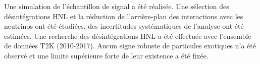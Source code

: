 \documentclass[./main.tex]{subfiles}
\begin{document}
Une simulation de l'échantillon de signal a été réalisée. Une sélection des désintégrations HNL et la réduction de l'arrière-plan des interactions avec les neutrinos ont été étudiées, des incertitudes systématiques de l'analyse ont été estimées. Une recherche des désintégrations HNL a été effectuée avec l'ensemble de données T2K (2010-2017). Aucun signe robuste de particules exotiques n'a été observé et une limite supérieure forte de leur existence a été fixée.
\end{document}
